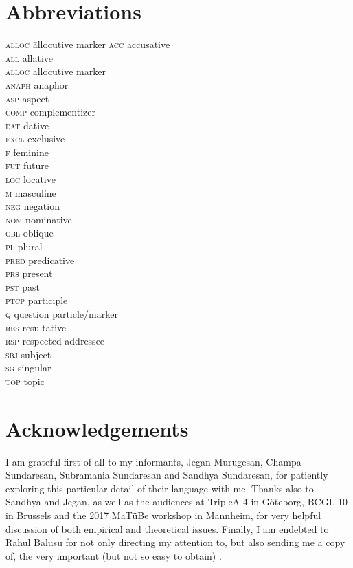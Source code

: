 \documentclass[output=paper, modfonts, nonflat]{langsci/langscibook}
\begin{document}
\section*{Abbreviations}
\begin{multicols}{2}
	\begin{tabbing}
\textsc{alloc}\hspace{5mm} \= allocutive marker\kill
	\textsc{acc} \> accusative\\
		\textsc{all} \> allative\\
  \textsc{alloc} \> allocutive marker\\
  \textsc{anaph} \> anaphor\\
  \textsc{asp} \> aspect\\
  	\textsc{comp} \> complementizer\\
  \textsc{dat} \> dative\\
  \textsc{excl} \> exclusive\\
  	\textsc{f} \> feminine\\
  	\textsc{fut} \> future\\
  	\textsc{loc} \> locative\\
  		\textsc{m} \> masculine\\
  		\textsc{neg} \> negation\\
  			\textsc{nom} \> nominative\\
  			\textsc{obl} \> oblique\\
  			\textsc{pl} \> plural\\
  			\textsc{pred} \> predicative\\
  			\textsc{prs} \> present\\
  \textsc{pst} \> past\\
  \textsc{ptcp} \> participle\\
  \textsc{q} \> question particle/marker\\
  \textsc{res} \> resultative\\
  \textsc{rsp} \> respected addressee\\
  	\textsc{sbj} \> subject\\
  		\textsc{sg} \> singular\\
  			\textsc{top} \> topic\\
	\end{tabbing} 
\end{multicols}

\section*{Acknowledgements}

I am grateful first of all to my informants, Jegan Murugesan, Champa
Sundaresan, Subramania Sundaresan and Sandhya Sundaresan, for
patiently exploring this particular detail of their language with
me. Thanks also to Sandhya and Jegan, as well as the audiences at
TripleA 4 in Göteborg, BCGL 10 in Brussels and the 2017 MaTüBe
workshop in Mannheim, for very helpful discussion of both empirical
and theoretical issues. Finally, I am endebted to Rahul Balusu for not
only directing my attention to, but also sending me a copy of, the
very important (but not so easy to obtain) \citet{amrit:1991}.

{\sloppy\printbibliography[heading=subbibliography,notkeyword=this]}
\end{document}
